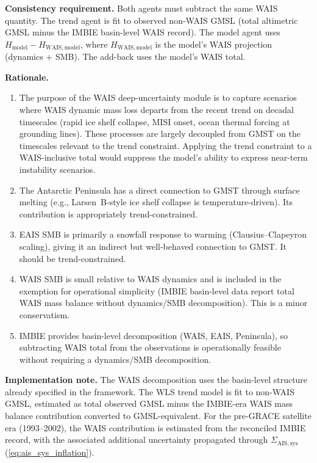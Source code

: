 \documentclass[11pt]{article}
\begin{document}
\textbf{Consistency requirement.}  Both agents must subtract the same WAIS quantity.  The trend agent is fit to observed non-WAIS GMSL (total altimetric GMSL minus the IMBIE basin-level WAIS record).  The model agent uses $H_{\mathrm{model}} - H_{\mathrm{WAIS,model}}$, where $H_{\mathrm{WAIS,model}}$ is the model's WAIS projection (dynamics + SMB).  The add-back uses the model's WAIS total.

\textbf{Rationale.}
\begin{enumerate}
  \item[(a)] The purpose of the WAIS deep-uncertainty module is to capture scenarios where WAIS dynamic mass loss departs from the recent trend on decadal timescales (rapid ice shelf collapse, MISI onset, ocean thermal forcing at grounding lines).  These processes are largely decoupled from GMST on the timescales relevant to the trend constraint.  Applying the trend constraint to a WAIS-inclusive total would suppress the model's ability to express near-term instability scenarios.
  \item[(b)] The Antarctic Peninsula has a direct connection to GMST through surface melting (e.g., Larsen~B-style ice shelf collapse is temperature-driven).  Its contribution is appropriately trend-constrained.
  \item[(c)] EAIS SMB is primarily a snowfall response to warming (Clausius--Clapeyron scaling), giving it an indirect but well-behaved connection to GMST.  It should be trend-constrained.
  \item[(d)] WAIS SMB is small relative to WAIS dynamics and is included in the exemption for operational simplicity (IMBIE basin-level data report total WAIS mass balance without dynamics/SMB decomposition).  This is a minor conservatism.
  \item[(e)] IMBIE provides basin-level decomposition (WAIS, EAIS, Peninsula), so subtracting WAIS total from the observations is operationally feasible without requiring a dynamics/SMB decomposition.
\end{enumerate}

\textbf{Implementation note.}  The WAIS decomposition uses the basin-level structure already specified in the framework.  The WLS trend model is fit to non-WAIS GMSL, estimated as total observed GMSL minus the IMBIE-era WAIS mass balance contribution converted to GMSL-equivalent.  For the pre-GRACE satellite era (1993--2002), the WAIS contribution is estimated from the reconciled IMBIE record, with the associated additional uncertainty propagated through $\Sigma_{\mathrm{AIS,sys}}$ (\cref{eq:ais_sys_inflation}).
\end{document}
